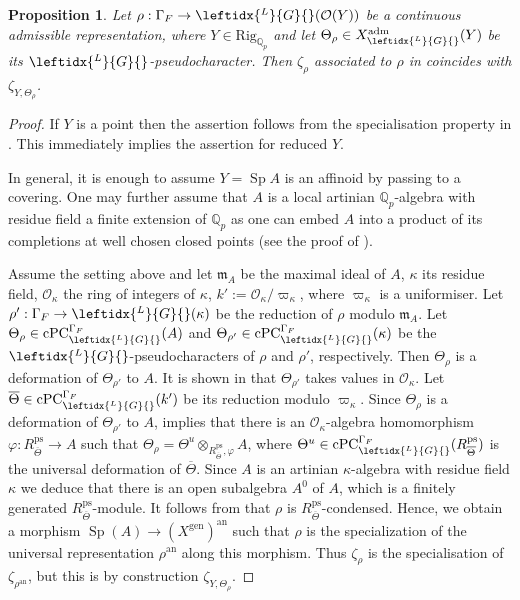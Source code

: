 \documentclass{amsart}
\newtheorem{prop}{Proposition}[section]
\theoremstyle{definition}
\theoremstyle{remark}
\DeclareMathOperator{\Sp}{Sp}
\newcommand{\Qp}{\mathbb {Q}_p}
\newcommand{\mm}{\mathfrak m}
\newcommand{\OO}{\mathcal O}
\newcommand{\ana}{\mathrm{an}}
\newcommand{\adm}{\mathrm{adm}}
\newcommand{\gen}{\mathrm{gen}}
\newcommand{\cPC}{\mathrm{cPC}}
\newcommand{\Thetabar}{\overline{\Theta}}
\newcommand{\ps}{\mathrm{ps}}
\newcommand{\LG}{\leftidx{^L}{G}{}}
\newcommand{\Rig}{\mathrm{Rig}}
\begin{document}
\begin{prop}\label{compatibility_L}
Let $\rho: \Gamma_F \rightarrow \LG(\OO(Y))$ 
be a continuous admissible representation, where $Y\in \Rig_{\Qp}$ and let $\Theta_{\rho} \in X^{\adm}_{\LG}(Y)$ be  its $\LG$-pseudocharacter. Then $\zeta_{\rho}$ associated to $\rho$ in \cite{DPS} coincides with $\zeta_{Y, \Theta_{\rho}}$.
\end{prop}
\begin{proof} If $Y$ is a point then the 
assertion follows from the specialisation property in . This immediately implies the assertion for reduced $Y$. 

In general, it is enough to assume $Y=\Sp A$ is an affinoid by
passing to a covering. One may further assume that $A$ is 
a local artinian $\Qp$-algebra with residue field a finite extension of $\Qp$ as one can embed $A$ into a product of its completions at well 
chosen closed points (see the proof of \cite[Proposition 8.1]{MRL}). 

Assume the setting above and let $\mm_A$ be the maximal ideal of $A$, $\kappa$ its residue field, $\OO_{\kappa}$ the ring of integers of $\kappa$,
$k':=\OO_{\kappa}/\varpi_{\kappa}$, where $\varpi_{\kappa}$ is a uniformiser.  Let $\rho':\Gamma_F \rightarrow \LG(\kappa)$ be the 
reduction of $\rho$ modulo $\mm_A$. Let 
$\Theta_{\rho}\in \cPC^{\Gamma_F}_{\LG}(A)$ and
$\Theta_{\rho'}\in \cPC^{\Gamma_F}_{\LG}(\kappa)$
be the $\LG$-pseudocharacters of $\rho$ and $\rho'$,
respectively. Then $\Theta_{\rho}$ is a deformation 
of $\Theta_{\rho'}$ to $A$. It is shown in \cite[Lemma 7.1]{MRL} that $\Theta_{\rho'}$ takes values in $\OO_{\kappa}$. Let 
$\overline{\Theta}
\in \cPC^{\Gamma_F}_{\LG}(k')$ be its
reduction modulo $\varpi_{\kappa}$.
Since $\Theta_{\rho}$ is a deformation of $\Theta_{\rho'}$ to $A$, \cite[Proposition 7.2]{MRL}
implies that there is an $\OO_{\kappa}$-algebra homomorphism $\varphi: R^{\ps}_{\Thetabar} \rightarrow A$ such that $\Theta_{\rho}= \Theta^u \otimes_{R^{\ps}_{\Thetabar}, \varphi} A$, where $\Theta^u\in \cPC^{\Gamma_F}_{\LG}(R^{\ps}_{\Thetabar})$ is the universal deformation of $\Thetabar$. Since $A$ is an 
artinian $\kappa$-algebra with residue field $\kappa$ 
we deduce that there is an open subalgebra $A^0$ of $A$, which is a finitely generated $R^{\ps}_{\Thetabar}$-module. It follows from 
\cite[Lemma 4.14]{defG} that $\rho$ is $R^{\ps}_{\Thetabar}$-condensed. 
Hence, we obtain  a morphism $\Sp(A)\rightarrow (X^{\gen})^{\ana}$ such that $\rho$ is the specialization of the universal representation $\rho^{\ana}$ along this morphism. Thus  $\zeta_{\rho}$ is the specialisation of $\zeta_{\rho^{\ana}}$, but this is by construction $\zeta_{Y, \Theta_{\rho}}$.
\end{proof}
\end{document}
